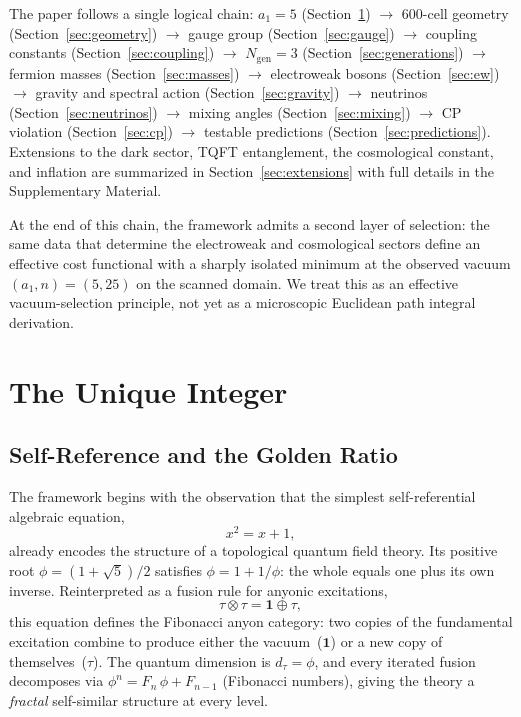 \documentclass[12pt,a4paper]{article}
\theoremstyle{definition}
\begin{document}
The paper follows a single logical chain: $a_1 = 5$ (Section~\ref{sec:integer}) $\to$ 600-cell geometry (Section~\ref{sec:geometry}) $\to$ gauge group (Section~\ref{sec:gauge}) $\to$ coupling constants (Section~\ref{sec:coupling}) $\to$ $N_{\text{gen}} = 3$ (Section~\ref{sec:generations}) $\to$ fermion masses (Section~\ref{sec:masses}) $\to$ electroweak bosons (Section~\ref{sec:ew}) $\to$ gravity and spectral action (Section~\ref{sec:gravity}) $\to$ neutrinos (Section~\ref{sec:neutrinos}) $\to$ mixing angles (Section~\ref{sec:mixing}) $\to$ CP violation (Section~\ref{sec:cp}) $\to$ testable predictions (Section~\ref{sec:predictions}).  Extensions to the dark sector, TQFT entanglement, the cosmological constant, and inflation are summarized in Section~\ref{sec:extensions} with full details in the Supplementary Material.

At the end of this chain, the framework admits a second layer of selection: the same data that determine the electroweak and cosmological sectors define an effective cost functional with a sharply isolated minimum at the observed vacuum $(a_1,n) = (5,25)$ on the scanned domain.  We treat this as an effective vacuum-selection principle, not yet as a microscopic Euclidean path integral derivation.


\section{The Unique Integer}
\label{sec:integer}

\subsection{Self-Reference and the Golden Ratio}

The framework begins with the observation that the simplest self-referential algebraic equation,
\[
x^2 = x + 1,
\]
already encodes the structure of a topological quantum field theory.  Its positive root $\phi = (1 + \sqrt{5})/2$ satisfies $\phi = 1 + 1/\phi$: the whole equals one plus its own inverse.  Reinterpreted as a fusion rule for anyonic excitations,
\begin{equation}
\tau \otimes \tau = \mathbf{1} \oplus \tau,
\label{eq:fibonacci_fusion}
\end{equation}
this equation defines the Fibonacci anyon category: two copies of the fundamental excitation combine to produce either the vacuum~($\mathbf{1}$) or a new copy of themselves~($\tau$).  The quantum dimension is $d_\tau = \phi$, and every iterated fusion decomposes via $\phi^n = F_n\,\phi + F_{n-1}$ (Fibonacci numbers), giving the theory a \emph{fractal} self-similar structure at every level.
\end{document}
